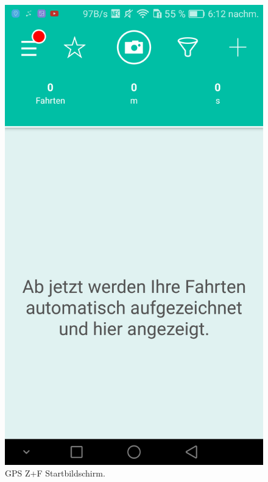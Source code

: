 \begin{figure}[H]%
    \begin{minipage}[b]{.4\linewidth} %
        \includegraphics[scale=0.14]{img/squ1}
        \caption{\label{img:img/squ1}GPS Z+F Startbildschirm.}
    \end{minipage}
    \hspace{0.1\linewidth}%
    \begin{minipage}[b]{.4\linewidth} %

\end{minipage}
\end{figure}
